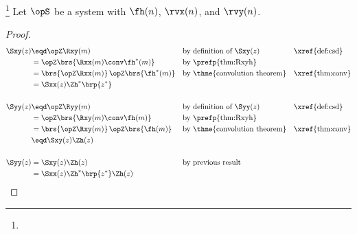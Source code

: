 \begin{theorem}
\footnote{
  }
\label{thm:Sxy}
Let $\opS$ be a system with  $\fh(n)$, 
 $\rvx(n)$, and  $\rvy(n)$.
\end{theorem}
\begin{proof}
\begin{align*}
  \Sxy(z)
     &\eqd \opZ \Rxy(m)
    && \text{by definition of $\Sxy(z)$}
    && \text{\xref{def:csd}}
   \\&= \opZ \brs{\Rxx(m) \conv \fh^\ast(m)}
    && \text{by \prefp{thm:Rxyh}}
   \\&= \brs{\opZ\Rxx(m)}\,\opZ\brs{\fh^\ast(m)}
    && \text{by \thme{convolution theorem}}
    && \text{\xref{thm:conv}}
   \\&= \Sxx(z) \Zh^\ast\brp{z^\ast}
   \\
   \\
  \Syy(z)
     &\eqd \opZ \Ryy(m)
    && \text{by definition of $\Syy(z)$}
    && \text{\xref{def:csd}}
   \\&= \opZ \brs{\Rxy(m) \conv \fh(m)}
    && \text{by \prefp{thm:Rxyh}}
   \\&= \brs{\opZ\Rxy(m)}\,\opZ\brs{\fh(m)}
    && \text{by \thme{convolution theorem}}
    && \text{\xref{thm:conv}}
   \\&\eqd \Sxy(z) \Zh(z)
   \\
   \\
  \Syy(z)
     &= \Sxy(z) \Zh(z)
     && \text{by previous result}
   \\&= \Sxx(z) \Zh^\ast\brp{z^\ast} \Zh(z)
\end{align*}
\end{proof}

